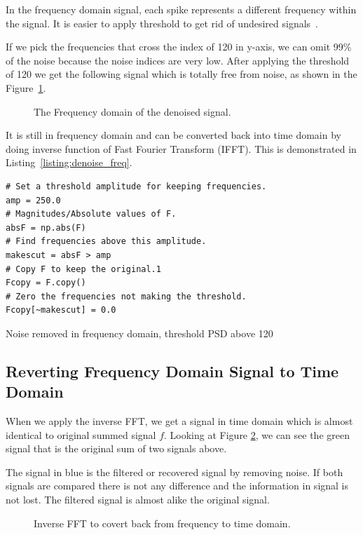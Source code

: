 \documentclass[a4paper, 12pt]{scrartcl}
\begin{document}
In the frequency domain signal, each spike represents a different frequency within the signal.
It is easier to apply threshold to get rid of undesired signals~\cite{fftfilter}.  

If we pick the frequencies that cross the index of 120 in y-axis, we can omit 99\% of the noise because the noise indices are very low.
After applying the threshold of 120 we get the following signal which is totally free from noise, as shown in the Figure~\ref{fig:denoise_freq}.
\begin{figure}[H] 
  \centering
  \resizebox{\textwidth}{!}{}
  \caption{The Frequency domain of the denoised signal.}
  \label{fig:denoise_freq}
\end{figure}
It is still in frequency domain and can be converted back into time domain by doing inverse function of Fast Fourier Transform (IFFT).
This is demonstrated in Listing~\ref{listing:denoise_freq}.
\begin{listing}[H]
\begin{verbatim}
# Set a threshold amplitude for keeping frequencies.
amp = 250.0
# Magnitudes/Absolute values of F.
absF = np.abs(F)
# Find frequencies above this amplitude.
makescut = absF > amp
# Copy F to keep the original.1
Fcopy = F.copy()
# Zero the frequencies not making the threshold.
Fcopy[~makescut] = 0.0
\end{verbatim}
\caption{Noise removed in frequency domain, threshold PSD above 120}
\label{listing:denoise_freq}
\end{listing}

\subsection{Reverting Frequency Domain Signal to Time Domain}
When we apply the inverse FFT, we get a signal in time domain which is almost identical to original summed signal $f$.
Looking at Figure \ref{fig:fft_infft_signals}, we can see the green signal that is the original sum of two signals above.

The signal in blue is the filtered or recovered signal by removing noise.
If both signals are compared there is not any difference and the information in signal is not lost. 
The filtered signal is almost alike the original signal.
\begin{figure}[H] 
  \centering
  \resizebox{\textwidth}{!}{}
  \caption{Inverse FFT to covert back from frequency to time domain.}
  \label{fig:fft_infft_signals}
\end{figure}
\end{document}
